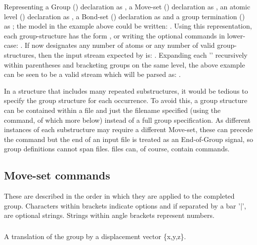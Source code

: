 Representing
a Group () declaration as  , 
a Move-set () declaration as  , 
an atomic level () declaration as  ,
a Bond-set () declaration as  and
a group termination () as ;
the model in the example above could be written:
.   Using this representation, each group-structure has the 
form , or writing the optional commands in lower-case:  .
If \Tt{*} now designates any number of atoms or any number of valid group-structures,
then the input stream expected by  is: . 
Expanding each '\Tt{*}' recursively within parentheses and bracketing groups on the same 
level, the above example can be seen to be a valid stream which will be parsed as:
.

In a structure that includes many repeated substructures, it would be tedious to 
specify the group structure for each occurrence.  To avoid this, a group structure can
be contained within a file and just the filename specified (using the  command,
of which more below) instead of a full group specification.  As different instances of
each substructure may require a different Move-set, these can precede the 
command but the end of an input file is treated as an End-of-Group signal, so group
definitions cannot span files.     files can, of course, contain 
commands.

\subsection{Move-set commands}

These are described in the order in which they are applied to the completed group.
Characters within brackets indicate options and if separated by a bar '|', are optional
strings.  Strings within angle brackets represent numbers.

\subsubsection{}

A translation of the group by a displacement vector \{x,y,z\}. 

\subsubsection{}

